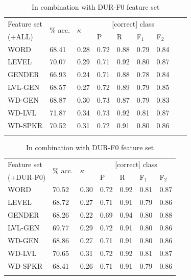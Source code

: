 		\begin{table}[htb]
			\centering
			\caption[Results of experiments with speaker and word features]{Results of experiments with speaker and word features   }
			
			\begin{subtable}{\textwidth}
			\centering
			\caption{In combination with ALL feature set}
			\begin{tabularx}{\textwidth}{lXXXXXXXX}			
			
			\toprule
			Feature set & \multirow{2}{*}{\% acc.} & \multirow{2}{*}{$\kappa$} & \multicolumn{4}{c}{[correct] class} \\
			 \cmidrule(lr){4-7}
			(+ALL)& & & P & R & F$_1$ & F$_2$ \\
			\midrule
WORD	&	68.41	&	0.28	&	0.72	&	0.88	&	0.79	&	0.84	\\
LEVEL	&	70.07	&	0.29	&	0.71	&	0.92	&	0.80	&	0.87	\\
GENDER	&	66.93	&	0.24	&	0.71	&	0.88	&	0.78	&	0.84	\\
\addlinespace													
LVL-GEN	&	68.57	&	0.27	&	0.72	&	0.89	&	0.79	&	0.85	\\
WD-GEN	&	68.87	&	0.30	&	0.73	&	0.87	&	0.79	&	0.83	\\
WD-LVL	&	71.87	&	0.34	&	0.73	&	0.92	&	0.81	&	0.87	\\		\addlinespace								
WD-SPKR	&	70.52	&	0.31	&	0.72	&	0.91	&	0.80	&	0.86	\\
			\bottomrule
			\label{tab:results:spkrword:all}
			\end{tabularx}
		\end{subtable}
		
		\begin{subtable}{\textwidth}
			\centering
			\caption{In combination with DUR-F0 feature set}
			\begin{tabularx}{\textwidth}{lXXXXXX}			
			\toprule
			Feature set & \multirow{2}{*}{\% acc.} & \multirow{2}{*}{$\kappa$} & \multicolumn{4}{c}{[correct] class} \\
			 \cmidrule(lr){4-7}
			(+DUR-F0)& & & P & R & F$_1$ & F$_2$ \\
			\midrule
WORD	&	70.52	&	0.30	&	0.72	&	0.92	&	0.81	&	0.87	\\
LEVEL	&	68.72	&	0.27	&	0.71	&	0.91	&	0.79	&	0.86	\\
GENDER	&	68.26	&	0.22	&	0.69	&	0.94	&	0.80	&	0.88	\\
\addlinespace											
LVL-GEN	&	69.77	&	0.29	&	0.72	&	0.91	&	0.80	&	0.86	\\
WD-GEN	&	68.86	&	0.27	&	0.71	&	0.91	&	0.80	&	0.86	\\
WD-LVL	&	70.65	&	0.31	&	0.72	&	0.92	&	0.81	&	0.87	\\
\addlinespace											
WD-SPKR	&	68.41	&	0.26	&	0.71	&	0.91	&	0.79	&	0.86	\\
			\bottomrule
			\label{tab:results:spkrword:durF0}
			\end{tabularx}
		\end{subtable}
		\label{tab:results:spkrword}
	\end{table}
	
